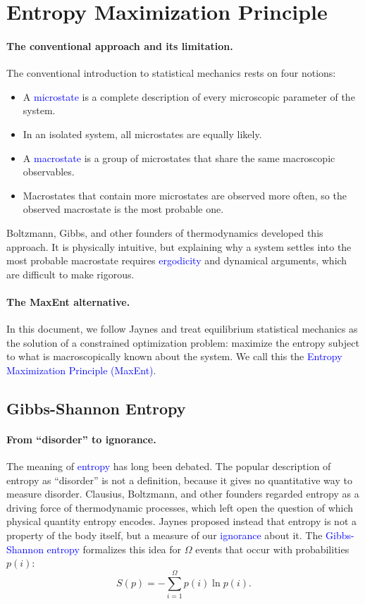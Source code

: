 \section{Entropy Maximization Principle}

\paragraph{The conventional approach and its limitation.}
The conventional introduction to statistical mechanics rests on four notions:
\begin{itemize}
    \item A \textcolor{blue}{microstate} is a complete description of every
    microscopic parameter of the system.
    \item In an isolated system, all microstates are equally likely.
    \item A \textcolor{blue}{macrostate} is a group of microstates that share
    the same macroscopic observables.
    \item Macrostates that contain more microstates are observed more often,
    so the observed macrostate is the most probable one.
\end{itemize}
Boltzmann, Gibbs, and other founders of thermodynamics developed this
approach. It is physically intuitive, but explaining why a system settles
into the most probable macrostate requires \textcolor{blue}{ergodicity} and
dynamical arguments, which are difficult to make rigorous.

\paragraph{The MaxEnt alternative.}
In this document, we follow Jaynes and treat equilibrium statistical
mechanics as the solution of a constrained optimization problem: maximize
the entropy subject to what is macroscopically known about the system. We
call this the \textcolor{blue}{Entropy Maximization Principle (MaxEnt)}.

\subsection{Gibbs-Shannon Entropy}

\paragraph{From ``disorder'' to ignorance.}
The meaning of \textcolor{blue}{entropy} has long been debated. The popular
description of entropy as ``disorder'' is not a definition, because it gives
no quantitative way to measure disorder. Clausius, Boltzmann, and other
founders regarded entropy as a driving force of thermodynamic processes, which
left open the question of which physical quantity entropy encodes. Jaynes
proposed instead that entropy is not a property of the body itself, but a
measure of our \textcolor{blue}{ignorance} about it. The
\textcolor{blue}{Gibbs-Shannon entropy} formalizes this idea for $\Omega$
events that occur with probabilities $p(i)$:
\begin{equation}
    \boxed{S(p) = -\sum_{i=1}^{\Omega} p(i)\ln p(i).}
\end{equation}

